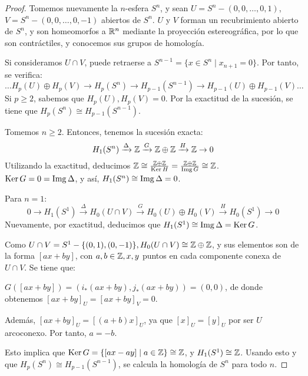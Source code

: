 \begin{proof}
  Tomemos nuevamente la $n$-esfera $S^n$, y sean $U = S^n - (0, 0, \dots, 0, 1)$, $V = S^n - (0, 0, \dots, 0, -1)$
  abiertos de $S^n$. $U$ y $V$ forman un recubrimiento abierto de $S^n$, y son homeomorfos a $\mathbb{R}^n$ mediante
  la proyección estereográfica, por lo que son contráctiles, y conocemos sus grupos de homología.

  Si consideramos $U \cap V$, puede retraerse a $S^{n-1} = \{x \in S^n \mid x_{n+1} = 0\}$. Por tanto, se verifica:
  \[ \dots H_p(U) \oplus H_p(V) \to H_p(S^n) \to H_{p-1}(S^{n-1}) \to H_{p-1}(U) \oplus H_{p-1}(V) \dots \]
  Si $p \geq 2$, sabemos que $H_p(U), H_p(V) = 0$. Por la exactitud de la sucesión, se tiene que $H_p(S^n) \cong H_{p-1}(S^{n-1})$.

  Tomemos $n \geq 2$. Entonces, tenemos la sucesión exacta:
  \[H_1(S^n) \xrightarrow{\Delta} \mathbb{Z} \xrightarrow{G} \mathbb{Z} \oplus \mathbb{Z} \xrightarrow{H} \mathbb{Z} \to 0\]
  Utilizando la exactitud, deducimos $\mathbb{Z} \cong \frac{\mathbb{Z} \oplus \mathbb{Z}}{\operatorname{Ker} H} = \frac{\mathbb{Z} \oplus \mathbb{Z}}{\operatorname{Img} G} \cong \mathbb{Z}$. \\
  $\operatorname{Ker} G = 0 = \operatorname{Img} \Delta$, y así, $H_1(S^n) \cong \operatorname{Img} \Delta = 0$.

  Para $n = 1$:
  \[ 0 \to H_1(S^1) \xrightarrow{\Delta} H_0(U \cap V) \xrightarrow{G} H_0(U) \oplus H_0(V) \xrightarrow{H} H_0(S^1) \to 0 \]
  Nuevamente, por exactitud, deducimos que $H_1(S^1) \cong \operatorname{Img} \Delta = \operatorname{Ker} G$.

  Como $U \cap V = S^1 - \{(0, 1), (0, -1)\}, H_0(U \cap V) \cong \mathbb{Z} \oplus \mathbb{Z}$, y sus elementos son de la forma
  $[ax + by]$, con $a,b \in \mathbb{Z}, x, y$ puntos en cada componente conexa de $U \cap V$. Se tiene que:

  $G([ax + by]) = (i_*(ax + by), j_*(ax + by)) = (0, 0)$, de donde obtenemos $[ax + by]_U = [ax + by]_V = 0$.

  Además, $[ax + by]_U = [(a+b) x]_U$, ya que $[x]_U = [y]_U$ por ser $U$ arcoconexo. Por tanto, $a = -b$.

  Esto implica que $\operatorname{Ker} G = \{[ax - ay] \mid a \in \mathbb{Z}\} \cong \mathbb{Z}$, y $H_1(S^1) \cong \mathbb{Z}$. Usando esto y que
  $H_p(S^n) \cong H_{p-1}(S^{n-1})$, se calcula la homología de $S^n$ para todo $n$.
\end{proof}
